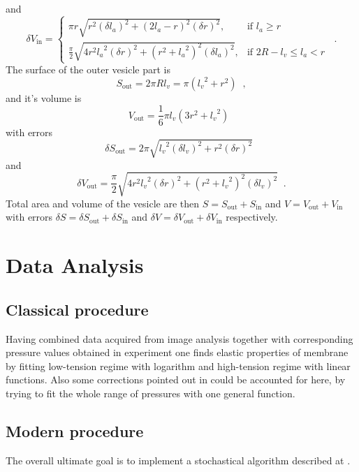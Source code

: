 \documentclass[a4paper,12pt]{article}
\begin{document}
and
\begin{equation*}
\delta V_{\text{in}} = \left\{
\begin{array}{ll}
	\pi r \sqrt{r^2\left(\delta l_a\right)^2 + \left(2l_a-r\right)^2 \left(\delta r\right)^2}, & \text{if } l_a \geq r\\
	\frac{\pi}{2} \sqrt{4 r^2 {l_a}^2\left(\delta r\right)^2 + \left(r^2+{l_a}^2\right)^2 \left(\delta l_a\right)^2}, & \text{if } 2R-l_v \leq l_a < r
\end{array}
\right.\;\;.
\end{equation*}
The surface of the outer vesicle part is
\begin{equation*}
S_\text{out} = 2\pi Rl_v = \pi \left({l_v}^2+r^2\right)\;\;,
\end{equation*}
and it's volume is
\begin{equation*}
V_\text{out} = \frac{1}{6}\pi l_v\left(3r^2+{l_v}^2\right)\;\;
\end{equation*}
with errors
\begin{equation*}
\delta S_\text{out} = 2\pi\sqrt{{l_v}^2 \left(\delta l_v\right)^2 + r^2 \left( \delta r\right) ^2}\;\;
\end{equation*}
and
\begin{equation*}
\delta V_\text{out} = \frac{\pi}{2} \sqrt{4 r^2 {l_v}^2\left(\delta r\right)^2 + \left(r^2+{l_v}^2\right)^2 \left(\delta l_v\right)^2}\;\;.
\end{equation*}
Total area and volume of the vesicle are then $S = S_\text{out}+S_\text{in}$ and $V = V_\text{out}+V_\text{in}$ with errors $\delta S = \delta S_\text{out} + \delta S_\text{in}$ and $\delta V = \delta V_\text{out} + \delta V_\text{in}$ respectively.

\section{Data Analysis}\label{analysis}
\subsection{Classical procedure}
Having combined data acquired from image analysis together with corresponding pressure values obtained in experiment one finds elastic properties of membrane by fitting low-tension regime with logarithm and high-tension regime with linear functions. Also some corrections pointed out in \cite{Henriksen2004, Fournier2001} could be accounted for here, by trying to fit the whole range of pressures with one general function.

\subsection{Modern procedure}
The overall ultimate goal is to implement a stochastical algorithm described at \cite{Henriksen2004}.


\end{document}
